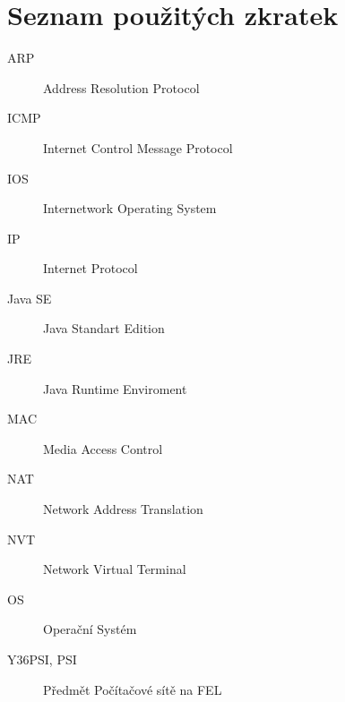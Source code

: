 \documentclass[11pt,twoside,a4paper]{book}
\begin{document}
%




%
{
\def\CS{$\cal C\kern-0.1667em\lower.5ex\hbox{$\cal S$}\kern-0.075em $}

}

%

\appendix

\chapter{Seznam použitých zkratek}

\begin{description}
\item[ARP] Address Resolution Protocol
\item[ICMP] Internet Control Message Protocol
\item[IOS] Internetwork Operating System
\item[IP] Internet Protocol
\item[Java SE] Java Standart Edition
\item[JRE] Java Runtime Enviroment
\item[MAC] Media Access Control
\item[NAT] Network Address Translation
\item[NVT] Network Virtual Terminal
\item[OS] Operační Systém
\item[Y36PSI, PSI] Předmět Počítačové sítě na FEL
\end{description}
\end{document}
